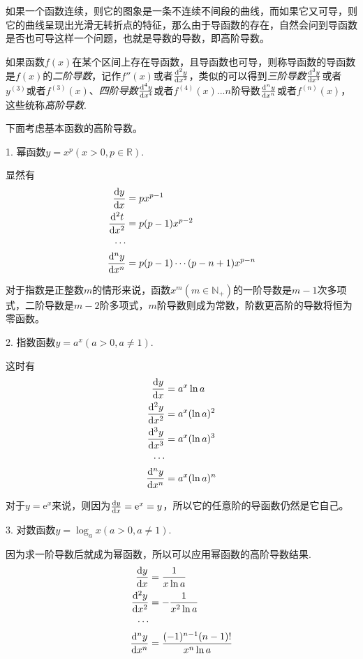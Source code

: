 如果一个函数连续，则它的图象是一条不连续不间段的曲线，而如果它又可导，则它的曲线呈现出光滑无转折点的特征，那么由于导函数的存在，自然会问到导函数是否也可导这样一个问题，也就是导数的导数，即高阶导数。

\begin{definition}
  如果函数$f(x)$在某个区间上存在导函数，且导函数也可导，则称导函数的导函数是$f(x)$的\emph{二阶导数}，记作$f''(x)$或者$\frac{\mathop{}\!\mathrm{d}^2y}{\mathop{}\!\mathrm{d} x^2}$，类似的可以得到\emph{三阶导数}$\frac{\mathop{}\!\mathrm{d}^3y}{\mathop{}\!\mathrm{d} x^3}$或者$y^{(3)}$或者$f^{(3)}(x)$、\emph{四阶导数}$\frac{\mathop{}\!\mathrm{d}^4 y}{\mathop{}\!\mathrm{d} x^4}$或者$f^{(4)}(x)$...$n$阶导数$\frac{\mathop{}\!\mathrm{d}^n y}{\mathop{}\!\mathrm{d} x^n}$或者$f^{(n)}(x)$，这些统称\emph{高阶导数}.
\end{definition}

下面考虑基本函数的高阶导数。

1. 幂函数$y=x^p(x>0, p \in \mathbb{R})$.

显然有
\begin{align*}
  \frac{\mathop{}\!\mathrm{d} y}{\mathop{}\!\mathrm{d} x} & = px^{p-1} \\
  \frac{\mathop{}\!\mathrm{d}^2 t}{\mathop{}\!\mathrm{d} x^2} & = p(p-1)x^{p-2} \\
  \cdots \\
  \frac{\mathop{}\!\mathrm{d} ^n y}{\mathop{}\!\mathrm{d} x^n} & = p(p-1)\cdots (p-n+1)x^{p-n}
\end{align*}

对于指数是正整数$m$的情形来说，函数$x^m(m \in \mathbb{N}_+)$的一阶导数是$m-1$次多项式，二阶导数是$m-2$阶多项式，$m$阶导数则成为常数，阶数更高阶的导数将恒为零函数。

2. 指数函数$y=a^x(a>0,a \neq 1)$.

这时有
\begin{align*}
  \frac{\dif y}{\dif x} & = a^x \ln{a} \\
  \frac{\dif^2 y}{\dif x^2} & = a^x (\ln{a})^2 \\
  \frac{\dif^3 y}{\dif x^3} & = a^x (\ln{a})^3 \\
  \cdots \\
  \frac{\dif^n y}{\dif x^n} & = a^x (\ln{a})^n \\
\end{align*}

对于$y=\mathrm{e}^x$来说，则因为$\frac{\mathop{}\!\mathrm{d} y}{\mathop{}\!\mathrm{d} x} = \mathrm{e}^x = y$，所以它的任意阶的导函数仍然是它自己。

3. 对数函数$y=\log_a x(a>0, a \neq 1)$.

因为求一阶导数后就成为幂函数，所以可以应用幂函数的高阶导数结果.
\begin{align*}
  \frac{\mathop{}\!\mathrm{d} y}{\mathop{}\!\mathrm{d} x} & = \frac{1}{x \ln{a}} \\
  \frac{\mathop{}\!\mathrm{d} ^2y}{\mathop{}\!\mathrm{d} x^2} & = - \frac{1}{x^2\ln{a}} \\
  \cdots \\
  \frac{\mathop{}\!\mathrm{d}^ny}{\mathop{}\!\mathrm{d} x^n} & = \frac{(-1)^{n-1}(n-1)!}{x^n \ln{a}}
\end{align*}

